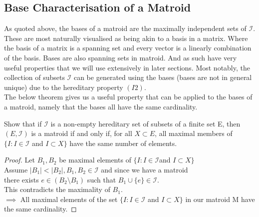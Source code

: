 \documentclass[../main.tex]{subfiles}
\begin{document}
 \subsection{Base Characterisation of a Matroid}
As quoted above, the bases of a matroid are the maximally independent sets of $\mathcal{I}.$  These are most naturally visualised as being akin to a basis in a matrix. Where the basis of a matrix is a spanning set and every vector is a linearly combination of the basis. Bases are also spanning sets in  matroid. And as such have very useful properties that we will use extensively in later sections. Most notably, the collection of subsets $\mathcal{I}$ can be generated using the bases (bases are not in general unique) due to the hereditary property $(I2).$ \\
The below theorem gives us a useful property that can be applied to the bases of a matroid, namely that the bases all have the same cardinality.
 \begin{thm}
 Show that if $\mathcal{I}$ is a non-empty hereditary set of subsets of a finite set E, then $(E,\mathcal{I})$ is a matroid if and only if, for all $X \subset E$, all maximal members of $\{I : I \in \mathcal{I} $ and $ I \subset X\}$ have the same number of elements.
 \end{thm}
\begin{proof}
 Let $B_1 , B_2$ be maximal elements of $\{I : I \in \mathcal{I} $and $ I \subset X\}$ \\
\noindent Assume $|B_1| < |B_2|, B_1, B_2 \in \mathcal{I}$ and since we have a matroid
\\
there exists $e \in (B_2 \setminus B_1)$ such that $B_1 \cup \{e\} \in \mathcal{I}.$
\\
This contradicts the maximality of $B_1$.\\
 \noindent $\implies$ All maximal elements of the set $\{I : I \in \mathcal{I} $ and $ I \subset X\}$ in our matroid M have the same cardinality.

\end{proof}
 
\end{document}
